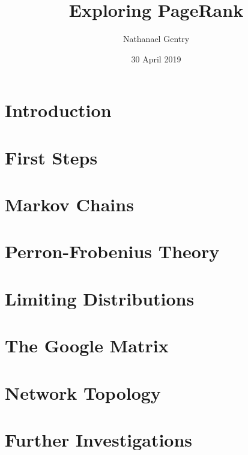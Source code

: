 \documentclass[11pt,letterpaper]{amsart}
\title{Exploring PageRank}
\author{Nathanael Gentry}
\date{30 April 2019}
\begin{document}
\maketitle
\tableofcontents

\section{Introduction}


\section{First Steps}


\section{Markov Chains}


\section{Perron-Frobenius Theory}


\section{Limiting Distributions}


\section{The Google Matrix}


\section{Network Topology}


\section{Further Investigations}


\newpage


\end{document}
